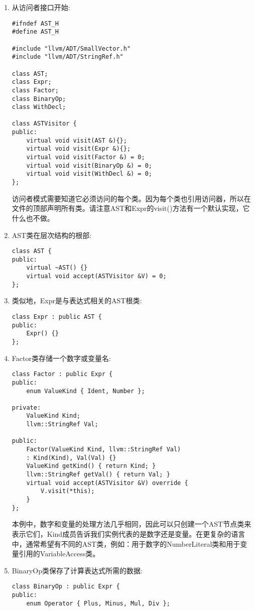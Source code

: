 \begin{enumerate}
\item 从访问者接口开始:
\begin{lstlisting}[caption={}]
#ifndef AST_H
#define AST_H

#include "llvm/ADT/SmallVector.h"
#include "llvm/ADT/StringRef.h"

class AST;
class Expr;
class Factor;
class BinaryOp;
class WithDecl;

class ASTVisitor {
public:
	virtual void visit(AST &){};
	virtual void visit(Expr &){};
	virtual void visit(Factor &) = 0;
	virtual void visit(BinaryOp &) = 0;
	virtual void visit(WithDecl &) = 0;
};
\end{lstlisting}
访问者模式需要知道它必须访问的每个类。因为每个类也引用访问器，所以在文件的顶部声明所有类。请注意AST和Expr的visit()方法有一个默认实现，它什么也不做。

\item AST类在层次结构的根部:
\begin{lstlisting}[caption={}]
class AST {
public:
	virtual ~AST() {}
	virtual void accept(ASTVisitor &V) = 0;
};
\end{lstlisting}

\item 类似地，Expr是与表达式相关的AST根类:
\begin{lstlisting}[caption={}]
class Expr : public AST {
public:
	Expr() {}
};
\end{lstlisting}

\item Factor类存储一个数字或变量名:
\begin{lstlisting}[caption={}]
class Factor : public Expr {
public:
	enum ValueKind { Ident, Number };
	
private:
	ValueKind Kind;
	llvm::StringRef Val;
	
public:
	Factor(ValueKind Kind, llvm::StringRef Val)
	: Kind(Kind), Val(Val) {}
	ValueKind getKind() { return Kind; }
	llvm::StringRef getVal() { return Val; }
	virtual void accept(ASTVisitor &V) override {
		V.visit(*this);
	}
};
\end{lstlisting}
本例中，数字和变量的处理方法几乎相同，因此可以只创建一个AST节点类来表示它们，Kind成员告诉我们实例代表的是数字还是变量。在更复杂的语言中，通常希望有不同的AST类，例如：用于数字的NumberLiteral类和用于变量引用的VariableAccess类。

\item BinaryOp类保存了计算表达式所需的数据:
\begin{lstlisting}[caption={}]
class BinaryOp : public Expr {
public:
	enum Operator { Plus, Minus, Mul, Div };
	

\end{lstlisting}
\end{enumerate}
